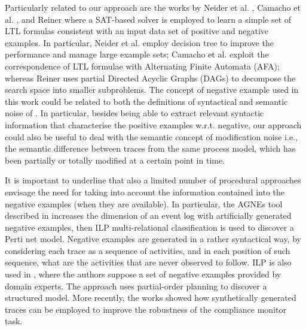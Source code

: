 Particularly related to our approach are the works by Neider et al. \cite{2018-Neider}, Camacho et al. \cite{2019-Camacho}, and Reiner \cite{2019-Riener} where a SAT-based solver is employed to learn a simple set of LTL formulas consistent with an input data set of positive and negative examples. In particular, Neider et al. \cite{2018-Neider}employ decision tree to improve the performance and manage large example sets; Camacho et al. \cite{2019-Camacho} exploit the correspondence of LTL formulae with Alternating Finite Automata (AFA); whereas Reiner uses partial Directed Acyclic Graphs (DAGs) to decompose the search space into smaller subproblems.
The concept of negative example used in this work could be related to both the definitions of syntactical and semantic noise of \cite{2009-Gunther}. In particular, besides being able to extract relevant syntactic information that characterise the positive examples w.r.t. negative, our approach could also be useful to deal with the semantic concept of modification noise i.e., the semantic difference between traces from the same process model, which has been partially or totally modified at a certain point in time. %
 
It is important to underline that also a limited number of procedural approaches envisage the need for taking into account the information contained into the negative examples (when they are available). 
In particular, the AGNEs tool described in \cite{2009-Goedertier} increases the dimension of an event log with artificially generated negative examples, then \ac{ILP} multi-relational classification is used to discover a Perti net model. Negative examples are generated in a rather syntactical way, by considering each trace as a sequence of activities, and in each position of such sequence, what are the activities that are never observed to follow. \ac{ILP} is also used in \cite{2006-Ferreira}, where the authors suppose a set of negative examples provided by domain experts. The approach uses partial-order planning to discover a structured model. More recently, the works \cite{2014-Broucke,2014-BrouckePhD} showed how synthetically generated traces can be employed to improve the robustness of the compliance monitor task. 
 
